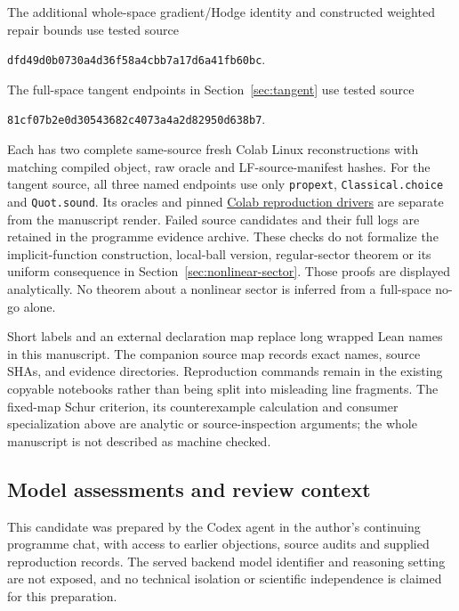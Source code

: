 \documentclass[11pt]{article}
\begin{document}
The additional whole-space gradient/Hodge identity and constructed weighted
repair bounds use tested source
\begin{center}\small\texttt{dfd49d0b0730a4d36f58a4cbb7a17d6a41fb60bc}.\end{center}
The full-space tangent endpoints in Section~\ref{sec:tangent} use tested source
\begin{center}\small\texttt{81cf07b2e0d30543682c4073a4a2d82950d638b7}.\end{center}
Each has two complete same-source fresh Colab Linux reconstructions with
matching compiled object, raw oracle and LF-source-manifest hashes. For the
tangent source, all three named endpoints use only \texttt{propext},
\texttt{Classical.choice} and \texttt{Quot.sound}. Its oracles and pinned
\href{https://github.com/lluiseriksson/THE-ERIKSSON-PROGRAMME/tree/e3bef02c87f4f6ea3392b3ed8fe8b54acb13a264/reproducibility/nonlinear-tangent-20261030}{Colab reproduction drivers}
are separate from the manuscript render. Failed source candidates and their
full logs are retained in the programme evidence archive. These checks do
not formalize the implicit-function construction, local-ball version,
regular-sector theorem or its uniform consequence in
Section~\ref{sec:nonlinear-sector}. Those proofs are displayed analytically.
No theorem about a nonlinear sector is inferred from a full-space no-go alone.

Short labels and an external declaration map replace long wrapped Lean names
in this manuscript. The companion source map records exact names, source SHAs,
and evidence directories. Reproduction commands remain in the existing
copyable notebooks rather than being split into misleading line fragments.
The fixed-map Schur criterion, its counterexample calculation and consumer
specialization above are analytic or source-inspection arguments; the whole
manuscript is not described as machine checked.

\clearpage
\subsection*{Model assessments and review context}
This candidate was prepared by the Codex agent in the author's continuing
programme chat, with access to earlier objections, source audits and supplied
reproduction records. The served backend model identifier and reasoning
setting are not exposed, and no technical isolation or scientific independence
is claimed for this preparation.
\end{document}
